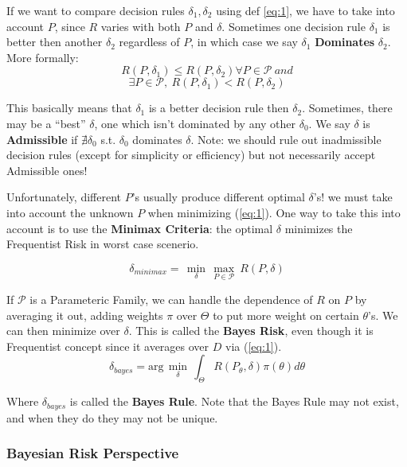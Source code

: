 \documentclass[]{article}
\theoremstyle{mattstyle}
\theoremstyle{definition}
\begin{document}
If we want to compare decision rules \(\delta_1, \delta_2\) using def \ref{eq:1}, we have to take into account \(P\), since \(R\) varies with both \(P\) and \(\delta\). Sometimes one decision rule \(\delta_1\) is better then another \(\delta_2\) regardless of \(P\), in which case we say \(\delta_1\) \textbf{Dominates} \(\delta_2\).
More formally:
$$R(P,\delta_1)\leq R(P,\delta_2) \forall P \in \mathcal{P}\ and$$
$$\exists P \in \mathcal{P},\ R(P,\delta_1) < R(P, \delta_2)$$

This basically means that \(\delta_1\) is a better decision rule then \(\delta_2\). Sometimes, there may be a ``best'' \(\delta\), one which isn't dominated by any other \(\delta_0\). We say \(\delta\) is \textbf{Admissible} if $\nexists \delta_0$ s.t. $\delta_0$ dominates $\delta$. Note: we should rule out inadmissible decision rules (except for simplicity or efficiency) but not necessarily accept Admissible ones!

Unfortunately, different \(P\)'s usually produce different optimal \(\delta\)'s! we must take into account the unknown \(P\) when minimizing (\ref{eq:1}). One way to take this into account is to use the \textbf{Minimax Criteria}: the optimal \(\delta\) minimizes the Frequentist Risk in worst case scenerio.

\begin{equation}\delta_{minimax} = \,\min\limits_{\delta}\,\max\limits_{P \in \mathcal{P}}\ R(P,\delta)
\end{equation}

If \(\mathcal{P}\) is a Parameteric Family, we can handle the dependence of \(R\) on \(P\) by averaging it out, adding weights \(\pi\) over $\Theta$ to put more weight on certain $\theta$'s. We can then minimize over \(\delta\). This is called the \textbf{Bayes Risk}, even though it is Frequentist concept since it averages over $D$ via (\ref{eq:1}).
\begin{equation}\label{eq:3}
\delta_{bayes}= \text{arg}\,\min\limits_{\delta}\,\int_{\Theta}^{}R(P_\theta,\delta)\pi(\theta)d\theta
\end{equation}

Where $\delta_{bayes}$ is called the \textbf{Bayes Rule}. Note that the Bayes Rule may not exist, and when they do they may not be unique.

\subsubsection{Bayesian Risk Perspective} 
\end{document}
